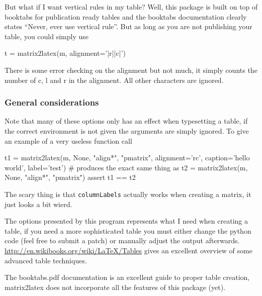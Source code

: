 But what if I want vertical rules in my table? Well, this package is built
on top of booktabs for publication ready tables and the booktabs documentation clearly
states ``Never, ever use vertical rule''. But as long as you are not publishing your table,
you could simply use
\begin{sageblock}
t = matrix2latex(m, alignment='|r||c|')
\end{sageblock}

There is some error checking on the alignment but not much, it simply counts the number
of c, l and r in the alignment. All other characters are ignored.

\subsubsection{General considerations}
Note that many of these options only has an effect when typesetting a table,
if the correct environment is not given the arguments are simply ignored.
To give an example of a very useless function call
\begin{sageblock}
t1 = matrix2latex(m, None, "align*", "pmatrix",
                 alignment='rc',
                 caption='hello world',
                 label='test')
# produces the exact same thing as
t2 = matrix2latex(m, None, "align*", "pmatrix")
assert t1 == t2
\end{sageblock}
The scary thing is that \lstinline{columnLabels} actually works when creating a matrix,
it just looks a bit wierd.

The options presented by this program represents what I need when creating a table,
if you need a more sophisticated table you must either change the python code
(feel free to submit a patch) or manually adjust the output afterwards.
\url{http://en.wikibooks.org/wiki/LaTeX/Tables} gives an excellent overview
of some advanced table techniques.

The booktabs.pdf documentation is an excellent guide to proper table creation,
matrix2latex does not incorporate all the features of this package (yet).

